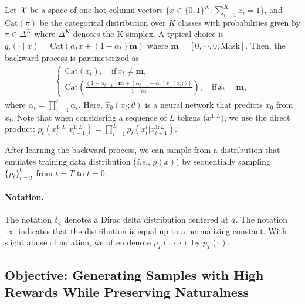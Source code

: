 \begin{example}\label{exa:discrete}
Let $\mathcal{X}$ be a space of one-hot column vectors $\{x\in\{0,1\}^K:\sum_{i=1}^K x_i =1\}$, and $\mathrm{Cat}(\pi)$ be the categorical distribution over $K$ classes with probabilities given by $\pi \in \Delta^K$ where $\Delta^K$ denotes the K-simplex. A typical choice is  
$q_t(\cdot\mid x) = \mathrm{Cat}(\alpha_t x+ (1-\alpha_t)\mathbf{m} )$ where $\mathbf{m}=[0,\cdots,0,\mathrm{Mask}]$. Then, the backward process is parameterized as 
\begin{align*}
   \begin{cases}
   \mathrm{Cat}(x_t ),\quad \mathrm{if}\, x_t\neq \mathbf{m},  \\
       \mathrm{Cat}\left ( \frac{(1-\bar \alpha_{t-1})\mathbf{m}  + (\bar \alpha_{t-1}- \bar \alpha_t) \hat x_0(x_t;\theta) }{ 1 - \bar \alpha_t } \right),\quad \mathrm{if}\,x_t= \mathbf{m}, 
   \end{cases}  
\end{align*}
where $\bar \alpha_t= \prod_{i=1}^t \alpha_i $. Here, $\hat{x}_0(x_t; \theta)$ is a neural network that predicts $x_0$ from $x_t$. Note that when considering a sequence of $L$ tokens ($x^{1:L})$, we use the direct product: $p_t(x^{1:L}_t|x^{1:L}_{t+1}) = \prod_{l=1}^L p_t(x^l_t|x^{1:L}_{t+1})$. 
\end{example}

After learning the backward process, we can sample from a distribution that emulates training data distribution (\textit{i.e.}, $p(x)$) by sequentially sampling $\{p_t\}_{t=T}^0$ from $t=T$ to $t=0$.

\vspace{-1mm}
\paragraph{Notation.} The notation $\delta_{a}$ denotes a Dirac delta distribution centered at $a$. The notation $\propto$ indicates that the distribution is equal up to a normalizing constant. With slight abuse of notation, we often denote $p_T(\cdot|\cdot,\cdot)$ by $p_{T}(\cdot)$. 

\vspace{-2mm}
\subsection{Objective: Generating Samples with High Rewards While Preserving Naturalness}
\vspace{-2mm}

